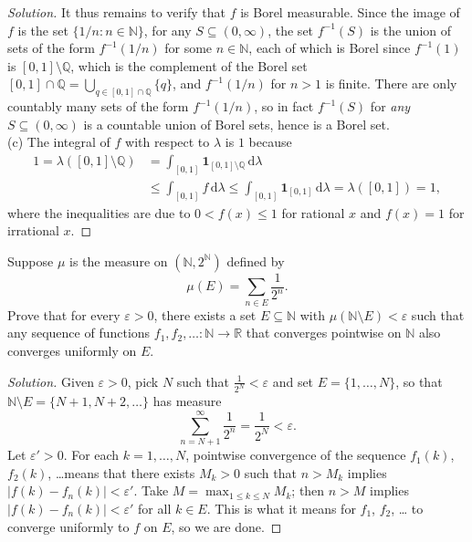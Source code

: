 \documentclass[10pt]{article}
\newcommand{\dd}{\,\mathrm{d}}
\providecommand{\eps}{\varepsilon}
\providecommand{\NN}{\mathbb N}
\providecommand{\QQ}{\mathbb Q}
\providecommand{\RR}{\mathbb R}
\providecommand{\inv}{^{-1}}
\newenvironment{soln}{\begin{proof}[Solution]}{\end{proof}}
\providecommand{\abs}[1]{\left|#1\right|}
\begin{document}
\begin{soln}
    It thus remains to verify that $f$ is Borel measurable.
    Since the image of $f$ is the set $\{1/n : n\in\NN\}$,
    for any $S\subseteq(0,\infty)$, the set $f\inv(S)$
    is the union of sets of the form $f\inv(1/n)$ for some $n\in\NN$,
    each of which is Borel since $f\inv(1)$ is $[0,1]\setminus\QQ$,
    which is the complement of the Borel set
    $[0,1]\cap\QQ = \bigcup_{q\in[0,1]\cap\QQ}\{q\}$,
    and $f\inv(1/n)$ for $n>1$ is finite.
    There are only countably many sets of the form $f\inv(1/n)$,
    so in fact $f\inv(S)$ for \emph{any} $S\subseteq(0,\infty)$ is
    a countable union of Borel sets, hence is a Borel set.
    \\

    (c) The integral of $f$ with respect to $\lambda$ is $\boxed1$ because
    \begin{align*}
	1 = \lambda([0,1]\setminus\QQ)
	&= \int_{[0,1]}\mathbf 1_{[0,1]\setminus\QQ}\dd\lambda\\
	&\le \int_{[0,1]} f\dd\lambda
	\le \int_{[0,1]} \mathbf 1_{[0,1]}\dd\lambda = \lambda([0,1]) = 1,
    \end{align*}
    where the inequalities are due to
    $0 < f(x)\le 1$ for rational $x$ and $f(x) = 1$ for irrational $x$.
\end{soln}

\begin{problem}
    Suppose $\mu$ is the measure on $(\NN, 2^\NN)$ defined by
    \begin{equation*}
	\mu(E) = \sum_{n\in E} \frac 1{2^n}.
    \end{equation*}
    Prove that for every $\eps>0$, there exists a set $E\subseteq\NN$
    with $\mu(\NN\setminus E) < \eps$ such that
    any sequence of functions $f_1,f_2,\dots\colon\NN\to\RR$
    that converges pointwise on $\NN$ also converges uniformly on $E$.
\end{problem}

\begin{soln}
    Given $\eps>0$, pick $N$ such that $\frac 1{2^N} < \eps$
    and set $E = \{1, \dots, N\}$, so that
    $\NN\setminus E = \{N+1, N+2, \dots\}$ has measure
    \begin{equation*}
	\sum_{n=N+1}^\infty \frac 1{2^n} = \frac 1{2^N} < \eps.
    \end{equation*}
    Let $\eps'>0$. For each $k=1,\dots,N$, pointwise convergence of the sequence
    $f_1(k)$, $f_2(k)$, \dots means that there exists $M_k>0$ such that
    $n>M_k$ implies $\abs{f(k) - f_n(k)} < \eps'$.
    Take $M = \max_{1\le k\le N} M_k$; then $n>M$ implies
    $\abs{f(k) - f_n(k)} < \eps'$ for all $k\in E$.
    This is what it means for $f_1$, $f_2$, \dots
    to converge uniformly to $f$ on $E$, so we are done.
\end{soln}
\end{document}
